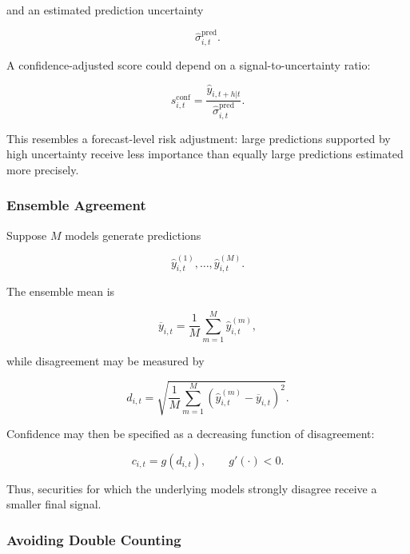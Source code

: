 \documentclass[11pt,a4paper]{article}
\begin{document}
and an estimated prediction uncertainty

\begin{equation}
\widehat{\sigma}_{i,t}^{\mathrm{pred}}.
\end{equation}

A confidence-adjusted score could depend on a signal-to-uncertainty ratio:

\begin{equation}
\boxed{
s_{i,t}^{\mathrm{conf}}
=
\frac{
\widehat{y}_{i,t+h|t}
}{
\widehat{\sigma}_{i,t}^{\mathrm{pred}}
}.
}
\end{equation}

This resembles a forecast-level risk adjustment: large predictions supported
by high uncertainty receive less importance than equally large predictions
estimated more precisely.


\subsubsection{Ensemble Agreement}

Suppose $M$ models generate predictions

\begin{equation}
\widehat{y}_{i,t}^{(1)},
\ldots,
\widehat{y}_{i,t}^{(M)}.
\end{equation}

The ensemble mean is

\begin{equation}
\overline{y}_{i,t}
=
\frac{1}{M}
\sum_{m=1}^{M}
\widehat{y}_{i,t}^{(m)},
\end{equation}

while disagreement may be measured by

\begin{equation}
d_{i,t}
=
\sqrt{
\frac{1}{M}
\sum_{m=1}^{M}
\left(
\widehat{y}_{i,t}^{(m)}
-
\overline{y}_{i,t}
\right)^2
}.
\end{equation}

Confidence may then be specified as a decreasing function of disagreement:

\begin{equation}
\boxed{
c_{i,t}
=
g(d_{i,t}),
\qquad
g'(\cdot)<0.
}
\end{equation}

Thus, securities for which the underlying models strongly disagree receive a
smaller final signal.


\subsubsection{Avoiding Double Counting}
\end{document}
